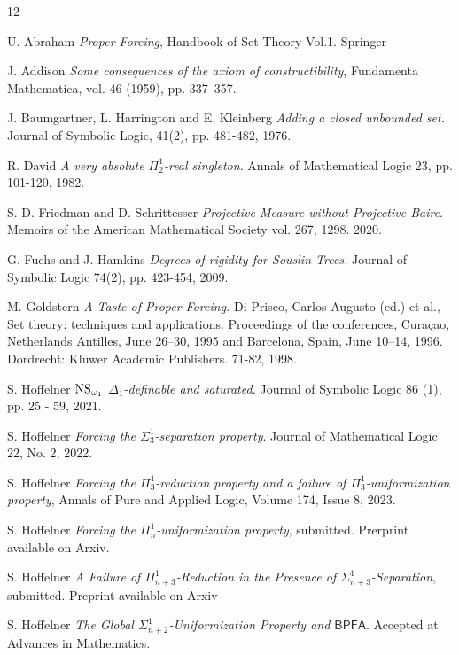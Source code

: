 \documentclass[a4paper,11pt]{article}
\begin{document}
\begin{thebibliography}{12}

U. Abraham \textit{ Proper Forcing}, Handbook of Set Theory Vol.1. Springer

  J. Addison \textit{Some consequences of the axiom of constructibility}, Fundamenta Mathematica, vol. 46 (1959), pp. 337–357.


 J. Baumgartner, L. Harrington and E. Kleinberg \textit{Adding a closed unbounded set.}  Journal of Symbolic Logic, 41(2), pp. 481-482, 1976.


R. David \textit{A very absolute $\Pi^1_2$-real singleton}. Annals of Mathematical Logic 23, pp. 101-120, 1982.

S. D. Friedman and D. Schrittesser \textit{Projective Measure without Projective Baire}.
Memoirs of the American Mathematical Society vol. 267, 1298. 2020.

G. Fuchs and J. Hamkins \textit{Degrees of rigidity for Souslin Trees.}
Journal of Symbolic Logic 74(2), pp. 423-454, 2009.

 M. Goldstern \textit{A Taste of Proper Forcing.} Di Prisco, Carlos Augusto (ed.) et al., Set theory: techniques and applications. Proceedings of the conferences, Curaçao, Netherlands Antilles, June 26–30, 1995 and Barcelona, Spain, June 10–14, 1996. Dordrecht: Kluwer Academic Publishers. 71-82, 1998.


    
 S. Hoffelner \textit{$\hbox{NS}_{\omega_1}$ $\Delta_1$-definable and saturated.}  Journal of Symbolic Logic 86 (1), pp. 25 - 59, 2021.

 S. Hoffelner \textit{Forcing the $\Sigma^1_3$-separation property}. Journal of Mathematical Logic 22, No. 2, 2022.



 S. Hoffelner \textit{Forcing the $\Pi^1_3$-reduction property and a failure of $\Pi^1_3$-uniformization property},
Annals of Pure and Applied Logic,
Volume 174, Issue 8,
2023.


 S. Hoffelner \textit{Forcing the $\Pi^1_n$-uniformization property}, submitted. Prerprint available on  Arxiv.

 S. Hoffelner \textit{A Failure of $\Pi^1_{n+3}$-Reduction in the Presence of $\Sigma^1_{n+3}$-Separation}, submitted. Preprint available on Arxiv 

 S. Hoffelner \textit{The Global $\Sigma^1_{n+2}$-Uniformization Property and $\mathsf{BPFA}$}. Accepted at Advances in Mathematics.




\end{thebibliography}
\end{document}
